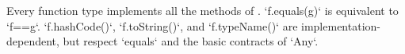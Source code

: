 Every function type implements all the methods of .
\xcd`f.equals(g)` is equivalent to \xcd`f==g`.  \xcd`f.hashCode()`, 
\xcd`f.toString()`, and \xcd`f.typeName()` are implementation-dependent, but
respect \xcd`equals` and the basic contracts of \xcd`Any`. 

